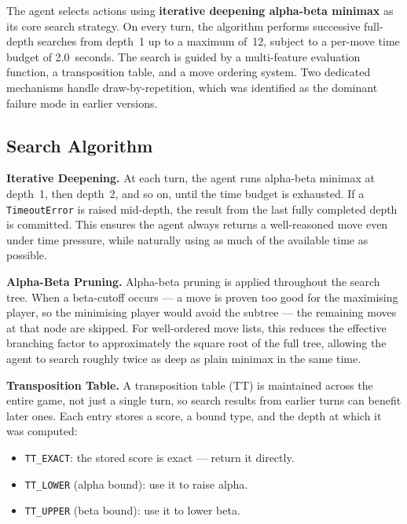 \documentclass[10pt,a4paper]{article}
\begin{document}
The agent selects actions using \textbf{iterative deepening alpha-beta minimax} as its core search strategy. On every turn, the algorithm performs successive full-depth searches from depth~1 up to a maximum of~12, subject to a per-move time budget of 2.0~seconds. The search is guided by a multi-feature evaluation function, a transposition table, and a move ordering system. Two dedicated mechanisms handle draw-by-repetition, which was identified as the dominant failure mode in earlier versions.

\subsection{Search Algorithm}

\textbf{Iterative Deepening.}
At each turn, the agent runs alpha-beta minimax at depth~1, then depth~2, and so on, until the time budget is exhausted. If a \texttt{TimeoutError} is raised mid-depth, the result from the last fully completed depth is committed. This ensures the agent always returns a well-reasoned move even under time pressure, while naturally using as much of the available time as possible.

\textbf{Alpha-Beta Pruning.}
Alpha-beta pruning is applied throughout the search tree. When a beta-cutoff occurs --- a move is proven too good for the maximising player, so the minimising player would avoid the subtree --- the remaining moves at that node are skipped. For well-ordered move lists, this reduces the effective branching factor to approximately the square root of the full tree, allowing the agent to search roughly twice as deep as plain minimax in the same time.

\textbf{Transposition Table.}
A transposition table (TT) is maintained across the entire game, not just a single turn, so search results from earlier turns can benefit later ones. Each entry stores a score, a bound type, and the depth at which it was computed:

\begin{itemize}[noitemsep]
    \item \texttt{TT\_EXACT}: the stored score is exact --- return it directly.
    \item \texttt{TT\_LOWER} (alpha bound): use it to raise alpha.
    \item \texttt{TT\_UPPER} (beta bound): use it to lower beta.
\end{itemize}
\end{document}

